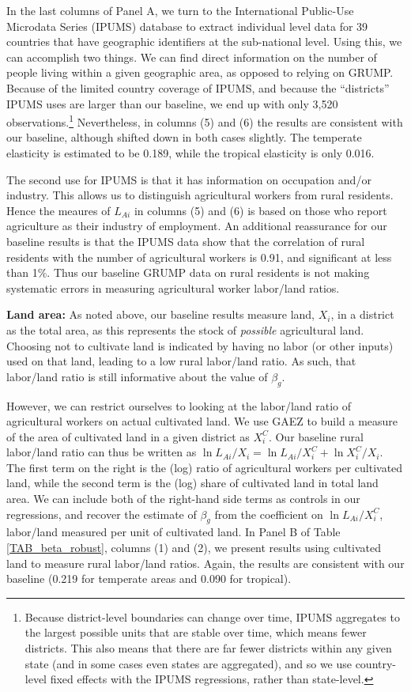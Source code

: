 \documentclass[11pt]{article}
\begin{document}
In the last columns of Panel A, we turn to the International Public-Use Microdata Series (IPUMS) database \nocite{ipums} to extract individual level data for 39 countries that have geographic identifiers at the sub-national level. Using this, we can accomplish two things. We can find direct information on the number of people living within a given geographic area, as opposed to relying on GRUMP. Because of the limited country coverage of IPUMS, and because the ``districts'' IPUMS uses are larger than our baseline, we end up with only 3,520 observations.\footnote{Because district-level boundaries can change over time, IPUMS aggregates to the largest possible units that are stable over time, which means fewer districts. This also means that there are far fewer districts within any given state (and in some cases even states are aggregated), and so we use country-level fixed effects with the IPUMS regressions, rather than state-level.} Nevertheless, in columns (5) and (6) the results are consistent with our baseline, although shifted down in both cases slightly. The temperate elasticity is estimated to be 0.189, while the tropical elasticity is only 0.016. 

The second use for IPUMS is that it has information on occupation and/or industry. This allows us to distinguish agricultural workers from rural residents. Hence the meaures of $L_{Ai}$ in columns (5) and (6) is based on those who report agriculture as their industry of employment. An additional reassurance for our baseline results is that the IPUMS data show that the correlation of rural residents with the number of agricultural workers is 0.91, and significant at less than 1\%. Thus our baseline GRUMP data on rural residents is not making systematic errors in measuring agricultural worker labor/land ratios.

\vspace{.5cm}\noindent\textbf{Land area:} As noted above, our baseline results measure land, $X_i$, in a district as the total area, as this represents the stock of \textit{possible} agricultural land. Choosing not to cultivate land is indicated by having no labor (or other inputs) used on that land, leading to a low rural labor/land ratio. As such, that labor/land ratio is still informative about the value of $\beta_g$.

However, we can restrict ourselves to looking at the labor/land ratio of agricultural workers on actual cultivated land. We use GAEZ to build a measure of the area of cultivated land in a given district as $X^C_i$. Our baseline rural labor/land ratio can thus be written as $\ln L_{Ai}/X_i = \ln L_{Ai}/X_i^C + \ln X_i^C/X_i$. The first term on the right is the (log) ratio of agricultural workers per cultivated land, while the second term is the (log) share of cultivated land in total land area. We can include both of the right-hand side terms as controls in our regressions, and recover the estimate of $\beta_g$ from the coefficient on $\ln L_{Ai}/X_i^C$, labor/land measured per unit of cultivated land. In Panel B of Table \ref{TAB_beta_robust}, columns (1) and (2), we present results using cultivated land to measure rural labor/land ratios. Again, the results are consistent with our baseline (0.219 for temperate areas and 0.090 for tropical). 
\end{document}
